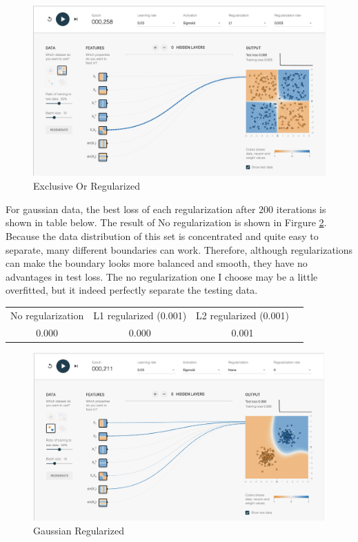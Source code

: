 \documentclass[11pt]{article}
\begin{document}
\begin{enumerate}
\begin{figure}[!h]
  \centering
  \includegraphics[width=\linewidth]{figures/1_2/exclusive_or.png}
  \caption{Exclusive Or Regularized}
  \label{fig:exclusive_or_reg}
\end{figure}


For gaussian data, the best loss of each regularization after $200$ iterations is shown in table below. The result of No regularization is shown in Firgure \ref{fig:gaussian_reg}. Because the data distribution of this set is concentrated and quite easy to separate, many different boundaries can work. Therefore, although regularizations can make the boundary looks more balanced and smooth, they have no advantages in test loss. The no regularization one I choose may be a little overfitted, but it indeed perfectly separate the testing data.

\begin{center}
  \begin{tabular}{ |c|c|c|c| }
   \hline
    No regularization & L1 regularized (0.001) & L2 regularized (0.001) \\
    0.000 & 0.000 & 0.001 \\
    \hline
  \end{tabular}
\end{center}


\begin{figure}[!h]
  \centering
  \includegraphics[width=\linewidth]{figures/1_2/gaussian.png}
  \caption{Gaussian Regularized}
  \label{fig:gaussian_reg}
\end{figure}


\end{enumerate}
\end{document}
